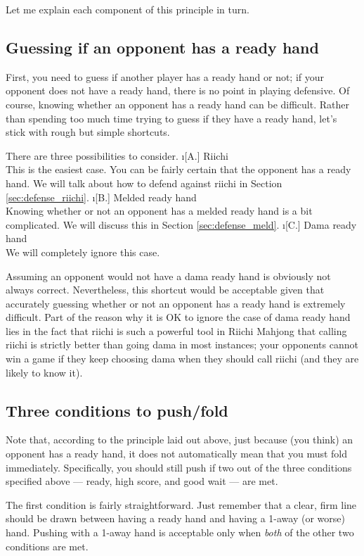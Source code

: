 \noindent Let me explain each component of this principle in turn. 

\subsection{Guessing if an opponent has a ready hand}
First, you need to guess if another player has a ready hand or not; if your opponent does not have a ready hand, there is no point in playing defensive. Of course, knowing whether an opponent has a ready hand can be difficult. Rather than spending too much time trying to guess if they have a ready hand, let's stick with rough but simple shortcuts. 

There are three possibilities to consider. 
\bi
\i[A.] {\jap Riichi}\\
	This is the easiest case. You can be fairly certain that the opponent has a ready hand. We will talk about how to defend against {\jap riichi} in Section \ref{sec:defense_riichi}.
\i[B.] Melded ready hand\\
	Knowing whether or not an opponent has a melded ready hand is a bit complicated. We will discuss this in Section \ref{sec:defense_meld}. 
\i[C.] {\jap Dama} ready hand\\
	We will completely ignore this case.
\ei

\bigskip
Assuming an opponent would not have a {\jap dama} ready hand is obviously not always correct. Nevertheless, this shortcut would be acceptable given that accurately guessing whether or not an opponent has a ready hand is extremely difficult. Part of the reason why it is OK to ignore the case of {\jap dama} ready hand lies in the fact that {\jap riichi} is such a powerful tool in Riichi Mahjong that calling {\jap riichi} is strictly better than going {\jap dama} in most instances; your opponents cannot win a game if they keep choosing {\jap dama} when they should call {\jap riichi} (and they are likely to know it). 

\subsection{Three conditions to push/fold}
Note that, according to the principle laid out above, just because (you think) an opponent has a ready hand, it does not automatically mean that you must fold immediately. Specifically, you should still push if two out of the three conditions  specified above --- ready, high score, and good wait --- are met. 

\bigskip
The first condition is fairly straightforward. Just remember that a clear, firm line should be drawn between having a ready hand and having a 1-away (or worse) hand. Pushing with a 1-away hand is acceptable only when \emph{both} of the other two conditions are met. 

